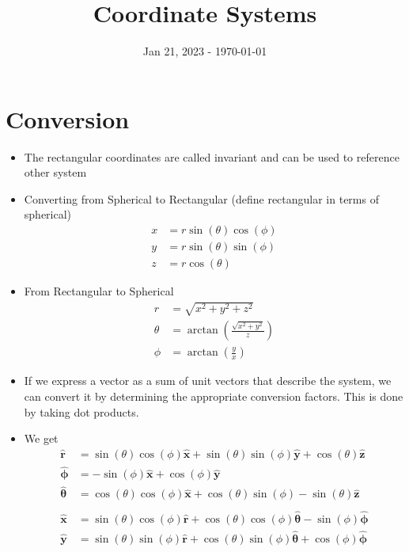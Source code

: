 \documentclass{article}
\title{Coordinate Systems}
\date{Jan 21, 2023 - \today}
\begin{document}
\maketitle
\section{Conversion}
\begin{itemize}
    \item The rectangular coordinates are called invariant and can be used to reference other system
    \item Converting from Spherical to Rectangular (define rectangular in terms of spherical)
        \begin{align}
            x &= r \sin{(\theta)} \cos{(\phi)}\\
            y &= r \sin{(\theta)} \sin{(\phi)}\\
            z &= r \cos{(\theta)}
        \end{align}
    \item From Rectangular to Spherical
        \begin{align}
            r &= \sqrt{x^2+y^2+z^2} \\
            \theta &= \arctan{\left(\frac{\sqrt{x^2+y^2}}{z}\right)} \\
            \phi &= \arctan{\left(\frac{y}{x}\right)}
        \end{align}
    \item If we express a vector as a sum of unit vectors that describe the system, we can convert it by determining the appropriate conversion factors. This is done by taking dot products.
    \item We get
        \begin{align}
            \hat{\mathbf{r}} & = \sin{(\theta)}\cos{(\phi)}\hat{\mathbf{x}}+\sin{(\theta)}\sin{(\phi)}\hat{\mathbf{y}}+\cos{(\theta)}\hat{\mathbf{z}}\\
            \hat{\mathbf{\phi}} & = -\sin{(\phi)}\hat{\mathbf{x}} + \cos{(\phi)}\hat{\mathbf{y}}\\
            \hat{\mathbf{\theta}} & = \cos{(\theta)}\cos{(\phi)}\hat{\mathbf{x}}+\cos{(\theta)}\sin{(\phi)}-\sin{(\theta)}\hat{\mathbf{z}}\\
            \\
            \hat{\mathbf{x}} & = \sin{(\theta)}\cos{(\phi)}\hat{\mathbf{r}}+\cos{(\theta)}\cos{(\phi)}\hat{\mathbf{\theta}}-\sin{(\phi)}\hat{\mathbf{\phi}}\\
            \hat{\mathbf{y}} & = \sin{(\theta)}\sin{(\phi)}\hat{\mathbf{r}}+\cos{(\theta)}\sin{(\phi)}\hat{\mathbf{\theta}}+\cos{(\phi)}\hat{\mathbf{\phi}}\\

\end{align}
\end{itemize}
\end{document}
